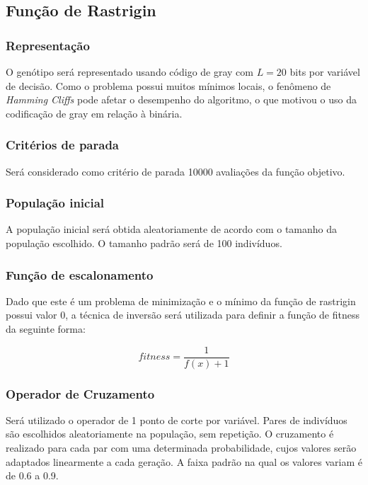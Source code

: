 \documentclass[conference]{IEEEtran}
\begin{document}
\subsection{Função de Rastrigin}

\subsubsection{{Representação}}
O genótipo será representado usando código de gray com $L = 20$ bits por variável de decisão. Como o problema possui muitos mínimos locais, o fenômeno de \textit{Hamming Cliffs} pode afetar o desempenho do algoritmo, o que motivou o uso da codificação de gray em relação à binária.

\subsubsection{{Critérios de parada}}
Será considerado como critério de parada 10000 avaliações da função objetivo.

\subsubsection{{População inicial}}
A população inicial será obtida aleatoriamente de acordo com o tamanho da população escolhido. O tamanho padrão será de 100 indivíduos.

\subsubsection{{Função de escalonamento}}
Dado que este é um problema de minimização e o mínimo da função de rastrigin possui valor 0, a técnica de inversão será utilizada para definir a função de fitness da seguinte forma:

\begin{equation}
fitness= \frac{1}{f(x) + 1}
\end{equation}

\subsubsection{{Operador de Cruzamento}}
Será utilizado o operador de 1 ponto de corte por variável. Pares de indivíduos são escolhidos aleatoriamente na população, sem repetição. O cruzamento é realizado para cada par com uma determinada probabilidade, cujos valores serão adaptados linearmente a cada geração. A faixa padrão na qual os valores variam é de 0.6 a 0.9.
\end{document}
